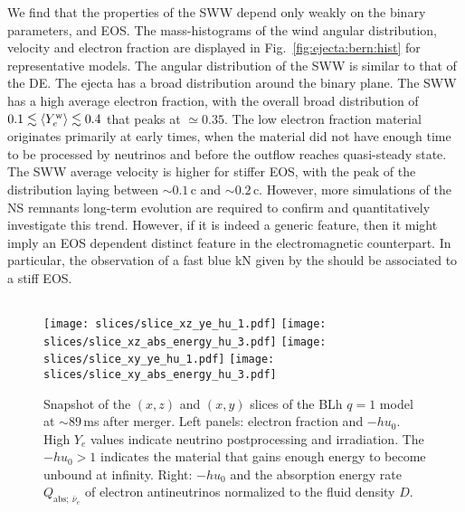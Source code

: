 We find that the properties of the \ac{SWW} depend only weakly on the binary parameters,
\mr{} and \ac{EOS}. The mass-histograms of the wind angular distribution, velocity and 
electron fraction are displayed in Fig.~\ref{fig:ejecta:bern:hist} for representative models. 
The angular distribution of the \ac{SWW} is similar to that of the \ac{DE}. The ejecta 
has a broad distribution around the binary plane.
The \ac{SWW} has a high average electron fraction, with the overall 
broad distribution of $0.1\lesssim \langle Y^{\text{w}}_{e}\rangle\lesssim0.4$ that peaks at ${\simeq}0.35$.
The low electron fraction material originates primarily at early times, when the 
material did not have enough time to be processed by neutrinos and before the 
outflow reaches quasi-steady state.
The \ac{SWW} average velocity is higher for stiffer \ac{EOS}, with the peak 
of the distribution laying between ${\sim}0.1\,$c and ${\sim}0.2\,$c.
However, more simulations of the \ac{NS} remnants long-term evolution are 
required to confirm and quantitatively investigate this trend.
However, if it is indeed a generic feature, then it might imply 
an \ac{EOS} dependent distinct feature in the electromagnetic counterpart. 
In particular, the observation of a fast blue kN given by the \swind{}
should be associated to a stiff \ac{EOS}.



\subsection{\nwind{}} \label{sec:bns_sims:nwind}

\begin{figure*}[t]
    \centering 
    \texttt{[image: slices/slice\_xz\_ye\_hu\_1.pdf]}
    \texttt{[image: slices/slice\_xz\_abs\_energy\_hu\_3.pdf]}
    \texttt{[image: slices/slice\_xy\_ye\_hu\_1.pdf]}
    \texttt{[image: slices/slice\_xy\_abs\_energy\_hu\_3.pdf]}
    \caption{Snapshot of the $(x,z)$ and $(x,y)$ slices of the BLh $q=1$ model at 
        ${\sim}89\,$ms after merger. Left panels: electron fraction and
        $-hu_0$. High $Y_e$ values indicate neutrino
        postprocessing and irradiation. The $-hu_0>1$ indicates the
        material that gains enough energy to become unbound at
        infinity. 
        Right: $-hu_0$ and the absorption energy rate $Q_{\text{abs};\:\bar{\nu}_e}$ 
        of electron antineutrinos normalized to the fluid density $D$.
    }
    \label{fig:slice:heating_hu}
\end{figure*}

